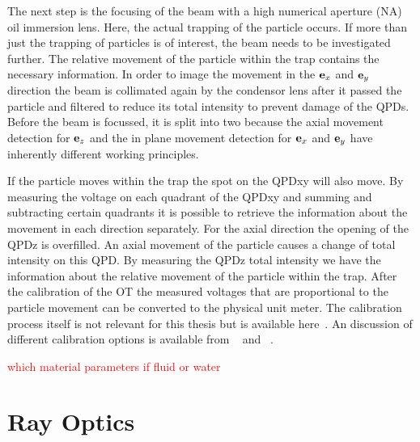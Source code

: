 The next step is the focusing of the beam with a high numerical aperture (NA) 
oil immersion lens. Here, the actual trapping of the particle occurs. If more 
than just the trapping of particles is of interest, the beam needs to be 
investigated further. The relative movement of the particle within the trap 
contains the necessary information. In order to image the movement in the $\vb{e}_{x}$ 
and $\vb{e}_{y}$ direction the beam is collimated again by the condensor lens after it 
passed the particle and filtered to reduce its total intensity to prevent 
damage of the QPDs. Before the beam is focussed, it is split into two because 
the axial movement detection for $\vb{e}_{z}$ and the in plane movement detection for 
$\vb{e}_{x}$ and $\vb{e}_{y}$ have inherently different working principles.

If the particle moves within the trap the spot on the QPDxy will also move. By 
measuring the voltage on each quadrant of the QPDxy and summing and subtracting 
certain quadrants it is possible to retrieve the information about the movement 
in each direction separately. For the axial direction the opening of the QPDz 
is overfilled. An axial movement of the particle causes a change of total 
intensity on this QPD. By measuring the QPDz total intensity we have the 
information about the relative movement of the particle within the trap. After 
the calibration of the OT the measured voltages that are proportional to the 
particle movement can be converted to the physical unit meter. The calibration 
process itself is not relevant for this thesis but is available 
here~\cite{Lamprecht2017}. An discussion of different calibration options is 
available from \citeauthor{Svoboda1994}~\cite{Svoboda1994} and 
\citeauthor{Jun2004}~\cite{Jun2004}.


\textcolor{red}{which material parameters if fluid or water}

\section{Ray Optics\label{sec:Th-rayoptics}}

